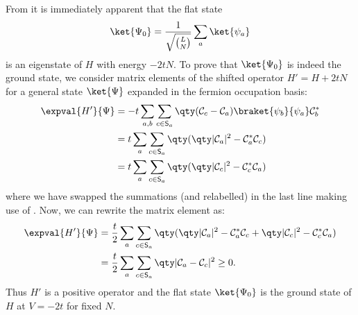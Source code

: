 From  it is immediately apparent that the flat state
\begin{equation}
\ket{\Psi_0} = \frac{1}{\sqrt{{L}\choose{N}}} \sum_a \ket{\psi_a}
    \label{eq:Psiflat}
\end{equation}
is an eigenstate of $H$ with energy $-2 t N$. To prove that $\ket{\Psi_0}$ is
indeed the ground state, we consider matrix elements of the shifted operator $H' = H +
2 t N$ for a general state $\ket{\Psi}$ expanded in the fermion occupation
basis:
%
\begin{align}
    \expval{H'}{\Psi} &= -t \sum_{a,b} \sum_{c \in \mathsf{S}_a}
    \qty(\mathcal{C}_c - \mathcal{C}_a) \braket{\psi_b}{\psi_a}
    \mathcal{C}^\ast_b \nonumber \\
                      &= t \sum_a \sum_{c \in \mathsf{S}_a}\qty(
                      \qty|\mathcal{C}_a|^2 - \mathcal{C}_a^\ast \mathcal{C}_c)
                      \nonumber \\
                      &= t \sum_a \sum_{c \in \mathsf{S}_a}\qty(
                      \qty|\mathcal{C}_c|^2 - \mathcal{C}_c^\ast \mathcal{C}_a)
\label{eq:HpExpValue}
\end{align}
%
where we have swapped the summations (and relabelled) in the last line making
use of . Now, we can rewrite the matrix element as:
%
\begin{align}
    \expval{H'}{\Psi} &= \frac{t}{2} \sum_a \sum_{c \in \mathsf{S}_a} \qty(
                      \qty|\mathcal{C}_a|^2 - \mathcal{C}_a^\ast \mathcal{C}_c
+ \qty|\mathcal{C}_c|^2 - \mathcal{C}_c^\ast \mathcal{C}_a) \nonumber \\
                      &= \frac{t}{2} \sum_a \sum_{c \in \mathsf{S}_a}
                      \qty|\mathcal{C}_a - \mathcal{C}_c|^2 \ge 0. 
\label{eq:HpExpValue2}
\end{align}
%
Thus $H'$ is a positive operator and the flat state $\ket{\Psi_0}$ is the
ground state of $H$ at $V = -2t$ for fixed $N$.

\FloatBarrier


